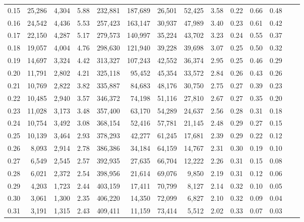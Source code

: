 \begin{tabular}{rrrrrrrrrrrrrr}
0.15 &  25,286 &  4,304 &    5.88 &  232,881 &  187,689 &  26,501 &  52,425 &  3.58 &  0.22 &  0.66 &      0.48 \\
0.16 &  24,542 &  4,436 &    5.53 &  257,423 &  163,147 &  30,937 &  47,989 &  3.40 &  0.23 &  0.61 &      0.42 \\
0.17 &  22,150 &  4,287 &    5.17 &  279,573 &  140,997 &  35,224 &  43,702 &  3.23 &  0.24 &  0.55 &      0.37 \\
0.18 &  19,057 &  4,004 &    4.76 &  298,630 &  121,940 &  39,228 &  39,698 &  3.07 &  0.25 &  0.50 &      0.32 \\
0.19 &  14,697 &  3,324 &    4.42 &  313,327 &  107,243 &  42,552 &  36,374 &  2.95 &  0.25 &  0.46 &      0.29 \\
0.20 &  11,791 &  2,802 &    4.21 &  325,118 &   95,452 &  45,354 &  33,572 &  2.84 &  0.26 &  0.43 &      0.26 \\
0.21 &  10,769 &  2,822 &    3.82 &  335,887 &   84,683 &  48,176 &  30,750 &  2.75 &  0.27 &  0.39 &      0.23 \\
0.22 &  10,485 &  2,940 &    3.57 &  346,372 &   74,198 &  51,116 &  27,810 &  2.67 &  0.27 &  0.35 &      0.20 \\
0.23 &  11,028 &  3,173 &    3.48 &  357,400 &   63,170 &  54,289 &  24,637 &  2.56 &  0.28 &  0.31 &      0.18 \\
0.24 &  10,754 &  3,492 &    3.08 &  368,154 &   52,416 &  57,781 &  21,145 &  2.48 &  0.29 &  0.27 &      0.15 \\
0.25 &  10,139 &  3,464 &    2.93 &  378,293 &   42,277 &  61,245 &  17,681 &  2.39 &  0.29 &  0.22 &      0.12 \\
0.26 &   8,093 &  2,914 &    2.78 &  386,386 &   34,184 &  64,159 &  14,767 &  2.31 &  0.30 &  0.19 &      0.10 \\
0.27 &   6,549 &  2,545 &    2.57 &  392,935 &   27,635 &  66,704 &  12,222 &  2.26 &  0.31 &  0.15 &      0.08 \\
0.28 &   6,021 &  2,372 &    2.54 &  398,956 &   21,614 &  69,076 &   9,850 &  2.19 &  0.31 &  0.12 &      0.06 \\
0.29 &   4,203 &  1,723 &    2.44 &  403,159 &   17,411 &  70,799 &   8,127 &  2.14 &  0.32 &  0.10 &      0.05 \\
0.30 &   3,061 &  1,300 &    2.35 &  406,220 &   14,350 &  72,099 &   6,827 &  2.10 &  0.32 &  0.09 &      0.04 \\
0.31 &   3,191 &  1,315 &    2.43 &  409,411 &   11,159 &  73,414 &   5,512 &  2.02 &  0.33 &  0.07 &      0.03 \\

\end{tabular}
